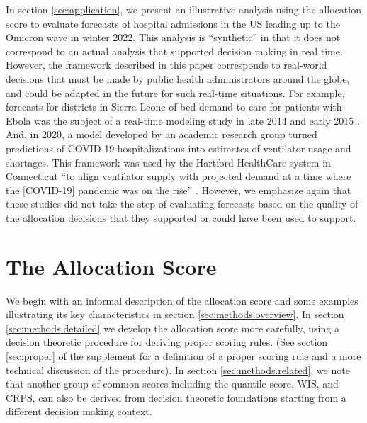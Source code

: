 \documentclass{article}\usepackage[]{graphicx}\usepackage[]{xcolor}
\begin{document}
In section \ref{sec:application}, we present an illustrative analysis using the allocation score to evaluate forecasts of hospital admissions in the US leading up to the Omicron wave in winter 2022.
This analysis is ``synthetic'' in that it does not correspond to an actual analysis that supported decision making in real time.
However, the framework described in this paper corresponds to real-world decisions that must be made by public health administrators around the globe, and could be adapted in the future for such real-time situations.
For example, forecasts for districts in Sierra Leone of bed demand to care for patients with Ebola was the subject of a real-time modeling study in late 2014 and early 2015 \citep{camacho2015-ebola-bed}.
And, in 2020, a model developed by an academic research group turned predictions of COVID-19 hospitalizations into estimates of ventilator usage and shortages. This framework was used by the Hartford HealthCare system in Connecticut ``to align ventilator supply with projected demand at a time where the [COVID-19] pandemic was on the rise'' \citep{bertsimas2021predictionsCOVID}.
However, we emphasize again that these studies did not take the step of evaluating forecasts based on the quality of the allocation decisions that they supported or could have been used to support.



\section{The Allocation Score}
\label{sec:methods}

We begin with an informal description of the allocation score and some examples illustrating its key characteristics in section \ref{sec:methods.overview}. In section \ref{sec:methods.detailed} we develop the allocation score more carefully, using a decision theoretic procedure for deriving proper scoring rules. (See section \ref{sec:proper} of the supplement for a definition of a proper scoring rule
and a more technical discussion of the procedure). In section \ref{sec:methods.related}, we note that another group of common scores including the quantile score, WIS, and CRPS, can also be derived from decision theoretic foundations \textemdash starting from a different decision making context.
\end{document}

